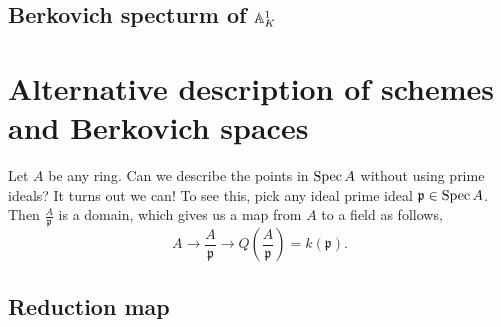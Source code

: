 \subsection{Berkovich specturm of $\mathbb{A}^{1}_K$} \label{sec:berkovich_specturm_of_affine_line}





\section{Alternative description of schemes and Berkovich spaces} \label{sec:alternative_description_of_schemes_and_berkovich_spaces}

Let $A$ be any ring. Can we describe the points in $\operatorname{Spec} A$ without using prime ideals? It turns out we can!
To see this, pick any ideal prime ideal $\mathfrak{p} \in \operatorname{Spec} A$. Then $\frac{A}{\mathfrak{p} }$ is a domain, which gives us a map from $A$ to a field as follows, \[
	A \to \frac{A}{\mathfrak{p} } \to Q\left( \frac{A}{\mathfrak{p} } \right) = k(\mathfrak{p} )
.\] 

\subsection{Reduction map} \label{sec:reduction_map}
